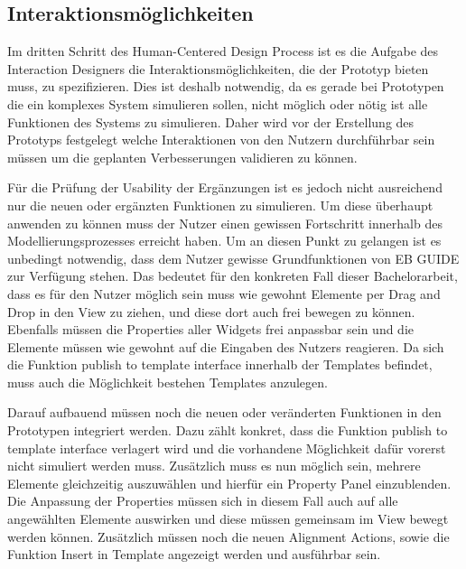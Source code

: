 \subsection{Interaktionsmöglichkeiten}

Im dritten Schritt des Human-Centered Design Process ist es die Aufgabe des Interaction Designers die Interaktionsmöglichkeiten, die der Prototyp bieten muss, zu spezifizieren.
Dies ist deshalb notwendig, da es gerade bei Prototypen die ein komplexes System simulieren sollen, nicht möglich oder nötig ist alle Funktionen des Systems zu simulieren.
Daher wird vor der Erstellung des Prototyps festgelegt welche Interaktionen von den Nutzern durchführbar sein müssen um die geplanten Verbesserungen validieren zu können.

Für die Prüfung der Usability der Ergänzungen ist es jedoch nicht ausreichend nur die neuen oder ergänzten Funktionen zu simulieren.
Um diese überhaupt anwenden zu können muss der Nutzer einen gewissen Fortschritt innerhalb des Modellierungsprozesses erreicht haben.
Um an diesen Punkt zu gelangen ist es unbedingt notwendig, dass dem Nutzer gewisse Grundfunktionen von EB GUIDE zur Verfügung stehen.
Das bedeutet für den konkreten Fall dieser Bachelorarbeit, dass es für den Nutzer möglich sein muss wie gewohnt Elemente per Drag and Drop in den View zu ziehen, und diese dort auch frei bewegen zu können.
Ebenfalls müssen die Properties aller Widgets frei anpassbar sein und die Elemente müssen wie gewohnt auf die Eingaben des Nutzers reagieren.
Da sich die Funktion \glqq publish to template interface\grqq{} innerhalb der Templates befindet, muss auch die Möglichkeit bestehen Templates anzulegen.

Darauf aufbauend müssen noch die neuen oder veränderten Funktionen in den Prototypen integriert werden.
Dazu zählt konkret, dass die Funktion \glqq publish to template interface\grqq{} verlagert wird und die vorhandene Möglichkeit dafür vorerst nicht simuliert werden muss.
Zusätzlich muss es nun möglich sein, mehrere Elemente gleichzeitig auszuwählen und hierfür ein Property Panel einzublenden.
Die Anpassung der Properties müssen sich in diesem Fall auch auf alle angewählten Elemente auswirken und diese müssen gemeinsam im View bewegt werden können.
Zusätzlich müssen noch die neuen Alignment Actions, sowie die Funktion \glqq Insert in Template\grqq{} angezeigt werden und ausführbar sein.

